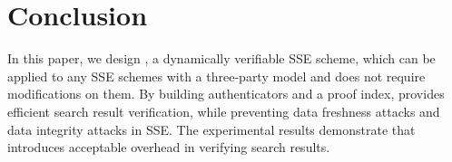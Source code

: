 \section{Conclusion}
In this paper, we design \name, a dynamically verifiable SSE scheme, which can be applied to any SSE schemes with a three-party model and does not require modifications on them. By building authenticators and a proof index, \name provides efficient search result verification, while preventing data freshness attacks and data integrity attacks in SSE. The experimental results demonstrate that \name introduces acceptable overhead in verifying search results.

